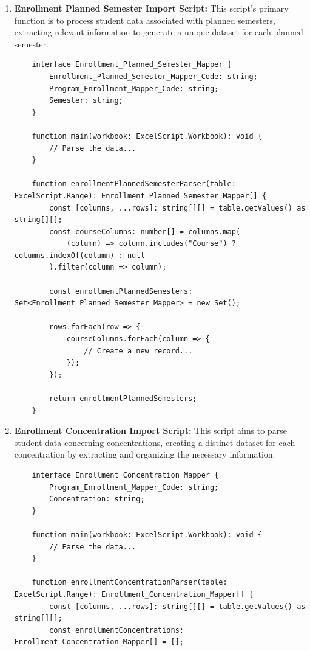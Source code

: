 \documentclass[12pt]{article}
\begin{document}
\begin{enumerate}[label=(\roman*)]
    \item \textbf{Enrollment Planned Semester Import Script:} This script's primary function is to process student data associated with planned semesters, extracting relevant information to generate a unique dataset for each planned semester.
    \begin{lstlisting}
    interface Enrollment_Planned_Semester_Mapper {
        Enrollment_Planned_Semester_Mapper_Code: string;
        Program_Enrollment_Mapper_Code: string;
        Semester: string;
    }

    function main(workbook: ExcelScript.Workbook): void {
        // Parse the data...
    }

    function enrollmentPlannedSemesterParser(table: ExcelScript.Range): Enrollment_Planned_Semester_Mapper[] {
        const [columns, ...rows]: string[][] = table.getValues() as string[][];
        const courseColumns: number[] = columns.map(
            (column) => column.includes("Course") ? columns.indexOf(column) : null
        ).filter(column => column);

        const enrollmentPlannedSemesters: Set<Enrollment_Planned_Semester_Mapper> = new Set();

        rows.forEach(row => {
            courseColumns.forEach(column => {
                // Create a new record...
            });
        });

        return enrollmentPlannedSemesters;
    }
    \end{lstlisting}

    \item \textbf{Enrollment Concentration Import Script:} This script aims to parse student data concerning concentrations, creating a distinct dataset for each concentration by extracting and organizing the necessary information.
    \begin{lstlisting}
    interface Enrollment_Concentration_Mapper {
        Program_Enrollment_Mapper_Code: string;
        Concentration: string;
    }

    function main(workbook: ExcelScript.Workbook): void {
        // Parse the data...
    }

    function enrollmentConcentrationParser(table: ExcelScript.Range): Enrollment_Concentration_Mapper[] {
        const [columns, ...rows]: string[][] = table.getValues() as string[][];
        const enrollmentConcentrations: Enrollment_Concentration_Mapper[] = [];


\end{lstlisting}
\end{enumerate}
\end{document}
